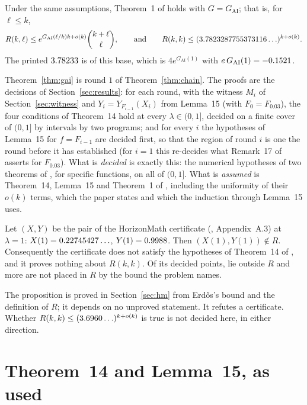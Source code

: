 \documentclass[11pt]{article}
\newcommand{\GAI}{G_{\mathrm{AI}}}
\begin{document}
\begin{theorem}\label{thm:gai}
Under the same assumptions, Theorem~1 of \cite{GNNW} holds with $G=\GAI$; that is, for $\ell\le k$,
\[
R(k,\ell)\le e^{\GAI(\ell/k)k+o(k)}\binom{k+\ell}{\ell},\qquad\text{and}\qquad R(k,k)\le(\CroundOne\ldots)^{k+o(k)}.
\]
The printed $3.78233$ is \PrintedIs{} of this base, which is $4e^{\GAI(1)}$ with $e\,\GAI(1)=\QaiSum$.
\end{theorem}

Theorem~\ref{thm:gai} is round $1$ of Theorem~\ref{thm:chain}. The proofs are the decisions of Section~\ref{sec:results}: for each round, with the witness $M_i$ of Section~\ref{sec:witness} and $Y_i=Y_{F_{i-1}}(X_i)$ from Lemma~15 (with $F_0=F_{0.03}$), the four conditions of Theorem~14 hold at every $\lambda\in(0,1]$, decided on a finite cover of $(0,1]$ by intervals by two programs; and for every $i$ the hypotheses of Lemma~15 for $f=F_{i-1}$ are decided first, so that the region of round $i$ is one the round before it has established (for $i=1$ this re-decides what Remark~17 of \cite{GNNW} asserts for $F_{0.03}$). What is \emph{decided} is exactly this: the numerical hypotheses of two theorems of \cite{GNNW}, for specific functions, on all of $(0,1]$. What is \emph{assumed} is Theorem~14, Lemma~15 and Theorem~1 of \cite{GNNW}, including the uniformity of their $o(k)$ terms, which the paper states and which the induction through Lemma~15 uses.

\begin{proposition}[unconditional]\label{prop:hm}
Let $(X,Y)$ be the pair of the HorizonMath certificate (\cite{HM}, Appendix~A.3) at $\lambda=1$: $X(1)=0.22745427\ldots$, $Y(1)=0.9988$. Then $(X(1),Y(1))\notin R$. Consequently the certificate does not satisfy the hypotheses of Theorem~14 of \cite{GNNW}, and it proves nothing about $R(k,k)$. Of its \HmPoints{} decided points, \HmOutside{} lie outside $R$ and \HmNotPlaced{} more are not placed in $R$ by the bound the problem names.
\end{proposition}

The proposition is proved in Section~\ref{sec:hm} from Erd\H{o}s's bound \cite{Erd47} and the definition of $R$; it depends on no unproved statement. It refutes a certificate. Whether $R(k,k)\le(3.6960\ldots)^{k+o(k)}$ is true is not decided here, in either direction.

\section{Theorem~14 and Lemma~15, as used}\label{sec:framework}
\end{document}

